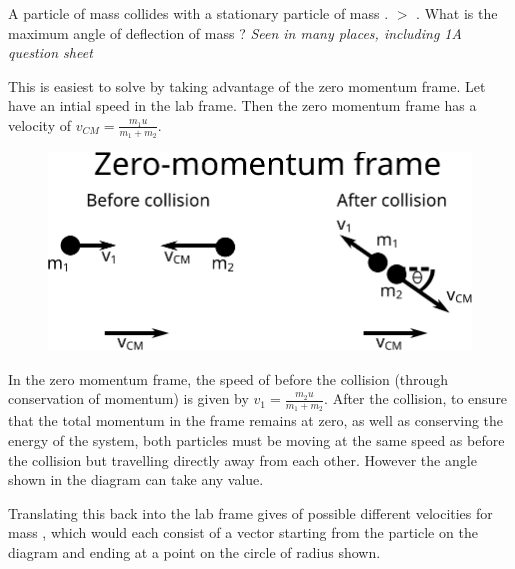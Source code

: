 
\begin{problem}   %
{A particle of mass  collides with a stationary particle of mass .  $>$ . What is the maximum angle of deflection of mass ?} %
{\textit{Seen in many places, including 1A question sheet}} %
{This is easiest to solve by taking advantage of the zero momentum frame. Let  have an intial speed  in the lab frame. Then the zero momentum frame has a velocity of $v_{CM} = \frac{m_{1}u}{m_{1} + m_{2}}$.

\begin{figure}[h]
\centering
\includegraphics[width=1.0\textwidth]{../../../figures/dynamics_zero_momentum_frame_deflection}
\caption{}\label{fig:dynamics_zero_momentum_frame_deflection}
\end{figure}


In the zero momentum frame, the speed of  before the collision (through conservation of momentum) is given by $v_1 = \frac{m_{2}u}{m_{1} + m_{2}}$. After the collision, to ensure that the total momentum in the frame remains at zero, as well as conserving the energy of the system, both particles must be moving at the same speed as before the collision but travelling directly away from each other. However the angle \vari{\theta} shown in the diagram can take any value.


Translating this back into the lab frame gives of possible different velocities for mass  , which would each consist of a vector starting from the particle on the diagram and ending at a point on the circle of radius  shown.

}
\end{problem}
